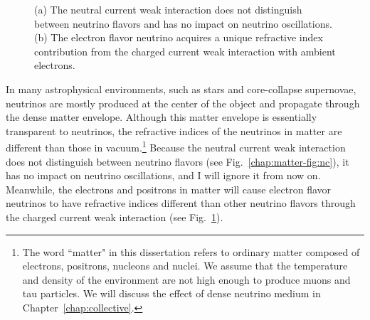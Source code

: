 \begin{figure}[htbp]
\begin{subfigure}[t]{0.40\textwidth}
    \caption{  }
    \label{chap:matter-fig:cc}
	\end{subfigure}
	\caption{
  (a) The neutral current weak interaction does not distinguish between neutrino flavors and has no impact on neutrino oscillations. (b) The electron flavor neutrino acquires a unique refractive index contribution from the charged current weak interaction with ambient electrons.
  }
    \label{chap:matter-fig:nc-cc}
\end{figure}

In many astrophysical environments, such as stars and core-collapse supernovae, neutrinos are mostly produced at the center of the object and propagate through the dense matter envelope. Although this matter envelope is essentially transparent to neutrinos, the refractive indices of the neutrinos in matter are different than those in vacuum.\footnote{The word ``matter" in this dissertation refers to ordinary matter composed of electrons, positrons, nucleons and nuclei. We assume that the temperature and density of the environment are not high enough to produce muons and tau particles. We will discuss the effect of dense neutrino medium in Chapter~\ref{chap:collective}.} Because the neutral current weak interaction does not distinguish between neutrino flavors (see Fig.~\ref{chap:matter-fig:nc}), it has no impact on neutrino oscillations, and I will ignore it from now on. Meanwhile, the electrons and positrons in matter will cause electron flavor neutrinos to have refractive indices different than other neutrino flavors through the charged current weak interaction (see Fig.~\ref{chap:matter-fig:cc}).

